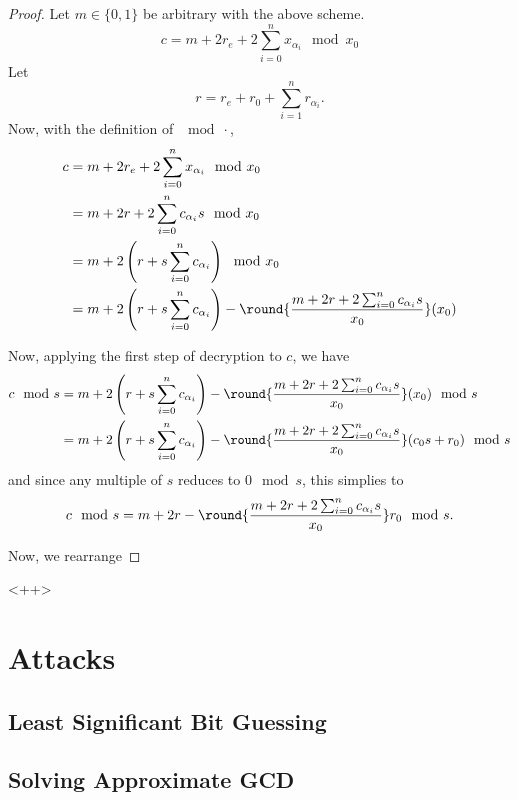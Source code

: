 \documentclass[a4paper,11pt, oneside]{article}
\begin{document}
\begin{proof}
    Let $m\in\{0,1\}$ be arbitrary with the above scheme.
    \[c = m + 2r_e + 2\sum_{i=0}^n x_{\alpha_i}\mod{x_0}\]
    Let \[r = r_e + r_0 + \sum_{i=1}^nr_{\alpha_i}.\]  Now, with the definition of $\mod{\cdot}$,
    \begin{align*}
        c &= m + 2r_e + 2\sum_{i=0}^n x_{\alpha_i}\mod{x_0}\\
        &= m + 2r + 2\sum_{i=0}^n c_{\alpha_i}s\mod{x_0}\\
        &= m + 2\left( r + s\sum_{i=0}^n c_{\alpha_i}\right)\mod{x_0}\\
        &= m + 2\left( r + s\sum_{i=0}^n c_{\alpha_i}\right) - \round{\frac{m + 2r + 2\sum_{i=0}^nc_{\alpha_i}s}{x_0}}(x_0)\\
    \end{align*}

Now, applying the first step of decryption to $c$, we have
    \begin{align*}
        c\mod{s} &= m + 2\left( r + s\sum_{i=0}^n c_{\alpha_i}\right) - \round{\frac{m + 2r + 2\sum_{i=0}^nc_{\alpha_i}s}{x_0}}(x_0)\mod{s}\\
                 &= m + 2\left( r + s\sum_{i=0}^n c_{\alpha_i}\right) - \round{\frac{m + 2r + 2\sum_{i=0}^nc_{\alpha_i}s}{x_0}}(c_0s+r_0)\mod{s}
    \end{align*}
    and since any multiple of $s$ reduces to $0\mod{s}$, this simplies to
    \[c\mod{s} = m + 2r - \round{\frac{m + 2r + 2\sum_{i=0}^nc_{\alpha_i}s}{x_0}}r_0\mod{s}.\]

    Now, we rearrange 



\end{proof}<++>


\section{Attacks}

\subsection{Least Significant Bit Guessing}
\subsection{Solving Approximate GCD}
\end{document}
